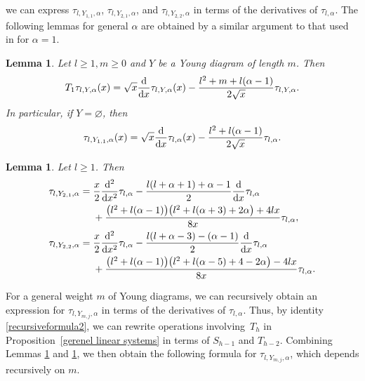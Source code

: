 \documentclass[pdftex]{sigma}
\numberwithin{equation}{section}
\newtheorem{Lemma}[Theorem]{Lemma}
\theoremstyle{definition}
\begin{document}
we can express $\tau_{l,Y_{1,1},\alpha}$, $\tau_{l,Y_{2,1},\alpha}$, and $\tau_{l,Y_{2,2},\alpha}$ in terms of the derivatives of $\tau_{l,\alpha}$. The following lemmas for general $\alpha$ are obtained by a similar argument to that used in \cite[Propositions~4.1 and~4.2]{KW24b} for $\alpha=1$.
\begin{Lemma}\label{length1}
Let $l\geq 1,m\geq 0$ and $Y$ be a Young diagram of length $m$. Then
\begin{equation*}
T_{1}\tau_{l,Y,\alpha}(x) = \sqrt{x}\frac{\rm d}{{\rm d}x} \tau_{l,Y,\alpha}(x) - \frac{l^2+m+l(\alpha-1)}{2\sqrt{x}}\tau_{l,Y,\alpha}.
\end{equation*}
In particular, if $Y=\varnothing$, then
\begin{equation}\label{initial1}
\tau_{l,Y_{1,1},\alpha}(x) = \sqrt{x}\frac{\rm d}{{\rm d}x} \tau_{l,\alpha}(x) - \frac{l^2+l(\alpha-1)}{2\sqrt{x}}\tau_{l,\alpha} .
\end{equation}
\end{Lemma}
\begin{Lemma}\label{length2}
\label{initial values of tau}
Let $l\geq 1$.
Then
\begin{align}
\tau_{l,Y_{2,1},\alpha} ={}&\frac{x}{2} \frac{{\rm d}^2}{{\rm d}x^2} \tau_{l,\alpha} - \frac{l(l+\alpha+1)+\alpha-1}{2} \frac{\rm d}{{\rm d}x} \tau_{l,\alpha} \nonumber\\
&+ \frac{\bigl(l^2+l(\alpha-1)\bigr)\bigl(l^2+l(\alpha+3)+2\alpha\bigr)+4lx}{8x} \tau_{l,\alpha},\label{initial21} \\
\tau_{l,Y_{2,2},\alpha} ={}& \frac{x}{2} \frac{{\rm d}^2}{{\rm d}x^2} \tau_{l,\alpha} - \frac{l(l+\alpha-3)-(\alpha-1)}{2} \frac{\rm d}{{\rm d}x} \tau_{l,\alpha}\nonumber\\
&+ \frac{\bigl(l^2+l(\alpha-1)\bigr)\bigl(l^2+l(\alpha-5)+4-2\alpha\bigr)-4lx}{8x} \tau_{l,\alpha}\label{initial22}.
\end{align}
\end{Lemma}
For a general weight $m$ of Young diagrams, we can recursively obtain an expression for $\tau_{l,Y_{m,j},\alpha}$ in terms of the derivatives of $\tau_{l,\alpha}$.
Thus,
by identity \eqref{recursiveformula2}, we can rewrite operations involving~$T_{h}$ in Proposition~\ref{gerenel linear systems} in terms of $S_{h-1}$ and $T_{h-2}$. Combining Lemmas \ref{length1} and \ref{length2}, we then obtain the following formula for $\tau_{l,Y_{m,j},\alpha}$, which depends recursively on $m$.
\end{document}
